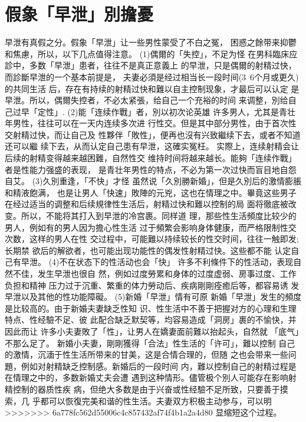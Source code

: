 \documentclass[12pt,UTF8]{ctexbook}
\begin{document}
\section{假象「早泄」別擔憂}

早泄有真假之分。假象「早泄」让一些男性蒙受了不白之冤，
困惑之餘带来抑鬱和焦慮，所以，以下几点值得注意。
(1)偶爾的「失控」，不足为怪
在男科臨床应診中，多数「早泄」患者，往往不是真正意義上
的早泄，只是偶爾的射精过快，而診斷早泄的一个基本前提是，
夫妻必須是经过相当长一段时间(3~6个月或更久)的共同生活
后，存在有持续的射精过快和難以自主控制现象，才最后可以认定
是早泄。所以，偶爾失控者，不必太紧張，给自己一个充裕的时间
来调整，別给自己过早「定性」.
(2)能「连续作戰」者，別以初次论英雄
许多男人，尤其是青壮年男性，往往可以在一天内连续多次进
行性交。但是其中部分男性，由于首次性交射精过快，而让自己及
性夥伴「敗性」，便再也沒有兴致繼续下去，或者不知道还可以繼
续下去，从而认定自己患有早泄，这確实冤枉。
实際上，连续射精会让后续的射精变得越来越困難，自然性交
维持时间将越来越长。能夠「连续作戰」者是性能力强盛的表现，
是青壮年男性的特点，不必为第一次过快而盲目地自怨自艾。
(3)久別重逢，「不快」才怪
虽然说「久別勝新婚」，但是久別后的激情膨脹和精液飽满，
也是让男人「快速」敗陣的元兇，这也在情理之中。畢竟这些男子
在经过适当的调整和后续規律性生活后，射精过快和難以控制的局
面将徹底被改变。所以，不能将其打入到早泄的冷宫裹。同样道
理，那些性生活頻度比较少的男人，例如有的男人因为擔心性生活
过于頻繁会影响身体健康，而严格限制性交次数，这样的男人在性
交过程中，可能難以持续较长的性交时间，往往一触即发;长期禁
欲后的解欲者，也可能出现功能性的偶发性射精过快。这些都不能
认定自己有早泄。
(4)不在状态下的性活动也会「快」
许多不利條件下的性活动，表现自然不佳，发生早泄也很自
然，例如过度勞累和身体的过度虚弱、房事过度、工作负担和精神
压力过于沉重、繁重的体力勞动后、疾病剛剛痊癒后等，都容易诱
发早泄以及其他的性功能障礙。
(5)新婚「早泄」情有可原
新婚「早泄」发生的頻度是比较高的。由于新婚夫妻缺乏性知
识、性生活中不善于把握对方的心理和生理特点、性经驗不足、彼
此配合缺乏默契等，均容易造成「洞房」裹的不愉快，并因此而让
许多小夫妻敗了「性」，让男人在嬌妻面前難以抬起头，自然就
「底气」不那么足了。
新婚小夫妻，剛剛獲得「合法」性生活的「许可」，難以控制
自己的激情，沉湎于性生活所带来的甘美，这是合情合理的，但随
之也会带来一些问題，例如对射精缺乏控制感。新婚后的一段时间
内，難以控制自己的射精过程是在情理之中的，多数新婚丈夫会遭
遇到这种情形。儘管极个別人可能存在影响射精控制的器质性疾
病，但绝大多数是由于兴奋或性经驗不足所致，只要善于摸索，几
乎都可以恢復完美和谐的性生活。夫妻双方积极主动参与，可以明
>>>>>>> 6a778fc562d55006c4c857432af74f4b1a2a4d80
显缩短这个过程。
\end{document}
